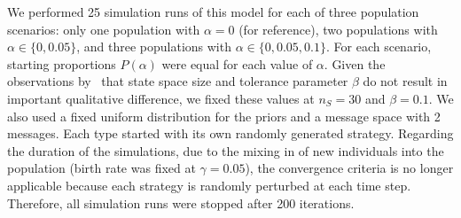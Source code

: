 \documentclass[a4paper]{article}
\begin{document}
We performed 25 simulation runs of this model for each of three population scenarios: only one population with $\alpha = 0$ (for reference), two populations with $\alpha \in \{0, 0.05\}$, and three populations with $\alpha \in \{0, 0.05, 0.1\}$.
For each scenario, starting proportions $P(\alpha)$ were equal for each value of $\alpha$.
Given the observations by~\textcite{franke_vagueness_2017} that state space size and tolerance parameter $\beta$ do not result in important qualitative difference, we fixed these values at $n_S = 30$ and $\beta = 0.1$.
We also used a fixed uniform distribution for the priors and a message space with 2 messages.
Each type started with its own randomly generated strategy.
Regarding the duration of the simulations, due to the mixing in of new individuals into the population (birth rate was fixed at $\gamma = 0.05$), the convergence criteria is no longer applicable because each strategy is randomly perturbed at each time step.
Therefore, all simulation runs were stopped after 200 iterations.
\end{document}
